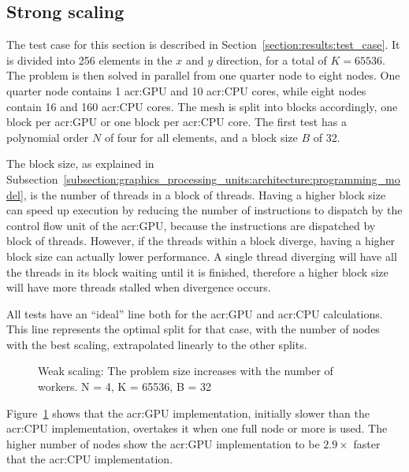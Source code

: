 \subsection{Strong scaling}\label{subsection:results:scaling_tests:strong}

The test case for this section is described in Section~\ref{section:results:test_case}. It is
divided into 256 elements in the \(x\) and \(y\) direction, for a total of \(K = 65536\). The
problem is then solved in parallel from one quarter node to eight nodes. One quarter node contains 1
\acrshort{acr:GPU} and 10 \acrshort{acr:CPU} cores, while eight nodes contain 16
 and 160 \acrshort{acr:CPU} cores. The mesh is split into blocks accordingly,
one block per \acrshort{acr:GPU} or one block per \acrshort{acr:CPU} core. The first test has a
polynomial order \(N\) of four for all elements, and a block size \(B\) of 32. 

The block size, as explained in
Subsection~\ref{subsection:graphics_processing_units:architecture:programming_model}, is the number
of threads in a block of threads. Having a higher block size can speed up execution by reducing the
number of instructions to dispatch by the control flow unit of the \acrshort{acr:GPU}, because the
instructions are dispatched by block of threads. However, if the threads within a block diverge,
having a higher block size can actually lower performance. A single thread diverging will have all
the threads in its block waiting until it is finished, therefore a higher block size will have more
threads stalled when divergence occurs.

All tests have an ``ideal'' line both for the \acrshort{acr:GPU} and \acrshort{acr:CPU}
calculations. This line represents the optimal split for that case, with the number of nodes with
the best scaling, extrapolated linearly to the other splits.

\begin{figure}[H]
	\centering
	
	\caption{Weak scaling: The problem size increases with the number of workers. N = 4, K = 65536, B = 32}\label{fig:strong_scaling_N4_W32}
\end{figure}

Figure~\ref{fig:strong_scaling_N4_W32} shows that the \acrshort{acr:GPU} implementation, initially
slower than the \acrshort{acr:CPU} implementation, overtakes it when one full node or more is used.
The higher number of nodes show the \acrshort{acr:GPU} implementation to be \(2.9 \times \) faster
that the \acrshort{acr:CPU} implementation.

